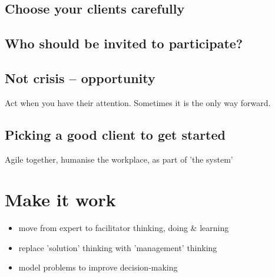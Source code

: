 \subsection{Choose your clients carefully}

\subsection{Who should be invited to participate?}

\subsection{Not crisis -- opportunity}
Act when you have their attention. Sometimes it is the only way forward.

\subsection{Picking a good client to get started}


Agile together, humanise the workplace, as part of 'the system'



\section*{Make it work}
\begin{itemize}
	\item move from expert to facilitator thinking, doing \& learning
	\item replace 'solution' thinking with 'management' thinking
	\item model problems to improve decision-making
\end{itemize}

